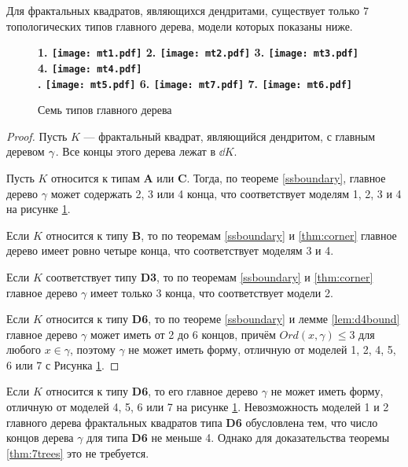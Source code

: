 \begin{theorem}\label{thm:7trees}
Для фрактальных квадратов, являющихся дендритами, существует только $7$ топологических типов главного дерева, модели которых показаны ниже.
\end{theorem}

\begin{figure}[H]
    \centering \Large {\bf
    1. \texttt{[image: mt1.pdf]}
    \hfill
    2. \texttt{[image: mt2.pdf]}
    \hfill
    3. \texttt{[image: mt3.pdf]}
    \hfill
    4. \texttt{[image: mt4.pdf]}\\
    . \texttt{[image: mt5.pdf]}
    \hfill
    6. \texttt{[image: mt7.pdf]}
    \hfill
    7. \texttt{[image: mt6.pdf]}}
    \caption{Семь типов главного дерева}
    \label{fig:7trees}
\end{figure}

\begin{proof}
Пусть $K$ --- фрактальный квадрат, являющийся дендритом, с главным деревом $\gamma$. 
Все концы этого дерева лежат в $\dd K$.

Пусть $K$ относится к типам {\bf A} или {\bf C}. 
Тогда, по теореме \ref{ssboundary}, главное дерево $\gamma$ может содержать 2, 3 или 4 конца, что соответствует моделям 1, 2, 3 и 4 на рисунке \ref{fig:7trees}.

Если $K$ относится к типу {\bf B}, то по теоремам \ref{ssboundary} и \ref{thm:corner} главное дерево имеет ровно четыре конца, что соответствует моделям 3 и 4.

Если $K$ соответствует типу {\bf D3}, то по теоремам \ref{ssboundary} и \ref{thm:corner} главное дерево $\gamma$ имеет только 3 конца, что соответствует модели 2.

Если $K$ относится к типу {\bf D6}, то по теореме \ref{ssboundary} и лемме \ref{lem:d4bound} главное дерево $\gamma$ может иметь от 2 до 6 концов, причём $ Ord(x,\gamma)\leq3$ для любого $x\in \gamma$, поэтому $\gamma$ не может иметь форму, отличную от моделей 1, 2, 4, 5, 6 или 7 с Рисунка \ref{fig:7trees}.
\end{proof}


\begin{remark}
Если $K$ относится к типу {\bf D6}, то его главное дерево $\gamma$ не может иметь форму, отличную от моделей 4, 5, 6 или 7 на рисунке \ref{fig:7trees}.
Невозможность моделей 1 и 2 главного дерева фрактальных квадратов типа {\bf D6} обусловлена тем, что число концов дерева $\gamma$ для типа {\bf D6} не меньше 4.
Однако для доказательства теоремы \ref{thm:7trees} это не требуется.
\end{remark}

